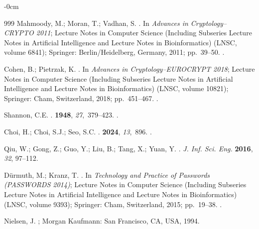 \documentclass[mathematics,article,accept,pdftex,moreauthors]{Definitions/mdpi}
\begin{document}
\begin{adjustwidth}{-\extralength}{0cm}
\begin{thebibliography}{999}
Mahmoody, M.; Moran, T.; Vadhan, S.
.
\newblock In \emph{Advances in Cryptology–CRYPTO 2011}; {Lecture Notes in Computer Science (Including Subseries Lecture
  Notes in Artificial Intelligence and Lecture Notes in Bioinformatics)} (LNSC, volume 6841); Springer: Berlin/Heidelberg, Germany, 2011; pp.~39--50.
.



Cohen, B.; Pietrzak, K.
.
\newblock In \emph{Advances in Cryptology--EUROCRYPT 2018}; {Lecture Notes in Computer Science (Including Subseries Lecture
  Notes in Artificial Intelligence and Lecture Notes in Bioinformatics)} (LNSC, volume 10821); Springer: Cham, Switzerland, 2018; pp.~451--467.
.



Shannon, C.E.
.
 {\bf 1948}, {\em 27},~379--423.
.

Choi, H.; Choi, S.J.; Seo, S.C.
.
 {\bf 2024}, {\em 13},~896.
.

Qiu, W.; Gong, Z.; Guo, Y.; Liu, B.; Tang, X.; Yuan, Y.
. \emph{J. Inf. Sci. Eng.} \textbf{2016}, \emph{32}, 97--112. 

D{\"{u}}rmuth, M.; Kranz, T.
.
\newblock In \emph{Technology and Practice of Passwords
(PASSWORDS 2014)}; { Lecture Notes in Computer Science (Including Subseries Lecture
  Notes in Artificial Intelligence and Lecture Notes in Bioinformatics)} (LNSC, volume 9393);  Springer: Cham, Switzerland, 2015; pp.~19--38.
.

Nielsen, J.
; Morgan Kaufmann: San Francisco, CA, USA,  1994.


\end{thebibliography}
\end{adjustwidth}
\end{document}
